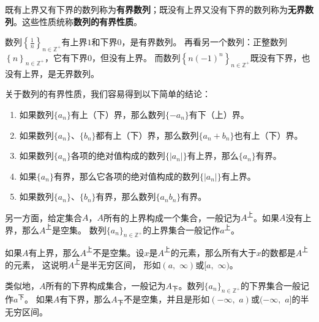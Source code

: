 \documentclass[12pt,UTF8]{ctexbook}
\begin{document}
既有上界又有下界的数列称为\textbf{有界数列}；既没有上界又没有下界的数列称为\textbf{无界数列}。这些性质统称\textbf{数列的有界性质}。

数列$\left\{\frac{1}{n}\right\}_{n\in\mathbb{Z}^+}$有上界$1$和下界$0$，是有界数列。
再看另一个数列：正整数列$\left\{n\right\}_{n\in\mathbb{Z}^+}$，它有下界$0$，但没有上界。
而数列$\left\{n(-1)^n\right\}_{n\in\mathbb{Z}^+}$既没有下界，也没有上界，是无界数列。

关于数列的有界性质，我们容易得到以下简单的结论：
\begin{enumerate}
    \item 如果数列$\{a_n\}$有上（下）界，那么数列$\{-a_n\}$有下（上）界。
    \item 如果数列$\{a_n\}$、$\{b_n\}$都有上（下）界，那么数列$\{a_n + b_n\}$也有上（下）界。
    \item 如果数列$\{a_n\}$各项的绝对值构成的数列$\{|a_n|\}$有上界，那么$\{a_n\}$有界。
    \item 如果$\{a_n\}$有界，那么它各项的绝对值构成的数列$\{|a_n|\}$有上界。
    \item 如果数列$\{a_n\}$、$\{b_n\}$有界，那么数列$\{a_n b_n\}$有界。
\end{enumerate}

另一方面，给定集合$A$，$A$所有的上界构成一个集合，一般记为$A^{\text{上}}$。如果$A$没有上界，那么$A^{\text{上}}$是空集。
数列$\{a_n\}_{n\in\mathbb{Z}^+}$的上界集合一般记作$a^{\text{上}}$。

如果$A$有上界，那么$A^{\text{上}}$不是空集。设$x$是$A^{\text{上}}$的元素，那么所有大于$x$的数都是$A^{\text{上}}$的元素，
这说明$A^{\text{上}}$是半无穷区间，
形如$(a, \,\,\infty)$或$[a,\,\, \infty)$。

类似地，$A$所有的下界构成集合，一般记为$A_{\text{下}}$。数列$\{a_n\}_{n\in\mathbb{Z}^+}$的下界集合一般记作$a^{\text{下}}$。
如果$A$有下界，那么$A_{\text{下}}$不是空集，并且是形如$(-\infty,\,\, a)$或$(-\infty,\,\, a]$的半无穷区间。
\end{document}
